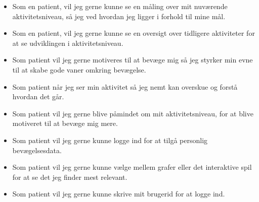 \begin{itemize}
\item Som en patient, vil jeg gerne kunne se en måling over mit nuværende aktivitetsniveau, så jeg ved hvordan jeg ligger i forhold til mine mål.
\item Som en patient, vil jeg gerne kunne se en oversigt over tidligere aktiviteter for at se udviklingen i aktivitetsniveau.
\item Som patient vil jeg gerne motiveres til at bevæge mig så jeg styrker min evne til at skabe gode vaner omkring bevægelse. 
\item Som patient når jeg ser min aktivitet så jeg nemt kan overskue og forstå hvordan det går.
\item Som patient vil jeg gerne blive påmindet om mit aktivitetsniveau, for at blive motiveret til at bevæge mig mere.
\item Som patient vil jeg gerne kunne logge ind for at tilgå personlig bevægelsesdata.
\item Som patient vil jeg gerne kunne vælge mellem grafer eller det interaktive spil for at se det jeg finder mest relevant.
\item Som patient vil jeg gerne kunne skrive mit brugerid for at logge ind.
\end{itemize}    